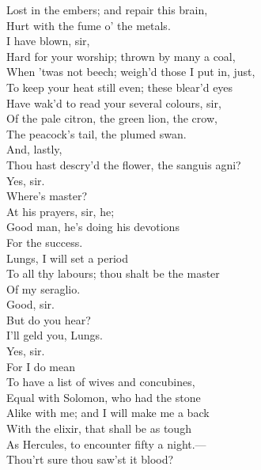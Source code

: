 \documentclass[a4paper,oneside]{memoir}
\begin{document}
\begin{drama*}
Lost in the embers; and repair this brain,\\
Hurt with the fume o' the metals.\\
\facespeaks {} I have blown, sir,\\
Hard for your worship; thrown by many a coal,\\
When 'twas not beech; weigh'd those I put in, just,\\
To keep your heat still even; these blear'd eyes\\
Have wak'd to read your several colours, sir,\\
Of the pale citron, the green lion, the crow,\\
The peacock's tail, the plumed swan.\\
\mammonspeaks {} And, lastly,\\
Thou hast descry'd the flower, the sanguis agni?\\
\facespeaks Yes, sir.\\
\mammonspeaks {} Where's master?\\
\facespeaks {} At his prayers, sir, he;\\
Good man, he's doing his devotions\\
For the success.\\
\mammonspeaks {} Lungs, I will set a period\\
To all thy labours; thou shalt be the master\\
Of my seraglio.\\
\facespeaks {} Good, sir.\\
\mammonspeaks {} But do you hear?\\
I'll geld you, Lungs.\\
\facespeaks {} Yes, sir.\\
\mammonspeaks {} For I do mean\\
To have a list of wives and concubines,\\
Equal with Solomon, who had the stone\\
Alike with me; and I will make me a back\\
With the elixir, that shall be as tough\\
As Hercules, to encounter fifty a night.---\\
Thou'rt sure thou saw'st it blood?\\

\end{drama*}
\end{document}
